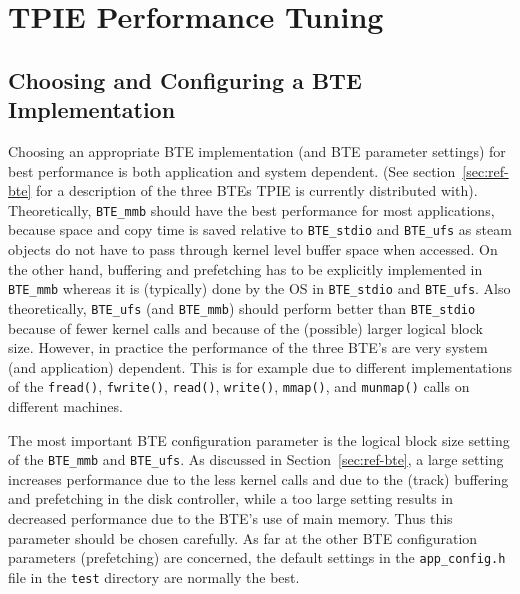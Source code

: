 \section{TPIE Performance Tuning}

\subsection{Choosing and Configuring a BTE Implementation}
\label{sec:choosingbte}


Choosing an appropriate BTE implementation (and BTE parameter settings) for
best performance is both application and system dependent. (See
section~\ref{sec:ref-bte} for a description of the three BTEs TPIE is
currently distributed with). Theoretically, \verb|BTE_mmb| should have the
best performance for most applications, because space and copy time is
saved relative to \verb|BTE_stdio| and \verb|BTE_ufs| as steam objects do
not have to pass through kernel level buffer space when accessed. On the
other hand, buffering and prefetching has to be explicitly implemented in
\verb|BTE_mmb| whereas it is (typically) done by the OS in \verb|BTE_stdio|
and \verb|BTE_ufs|. Also theoretically, \verb|BTE_ufs| (and \verb|BTE_mmb|)
should perform better than \verb|BTE_stdio| because of fewer kernel calls
and because of the (possible) larger logical block size. However, in
practice the performance of the three BTE's are very system (and
application) dependent. This is for example due to different
implementations of the \verb|fread()|, \verb|fwrite()|, \verb|read()|,
\verb|write()|, \verb|mmap()|, and \verb|munmap()| calls on different
machines.

The most important BTE configuration parameter is the logical block size
setting of the \verb|BTE_mmb| and \verb|BTE_ufs|. As discussed in
Section~\ref{sec:ref-bte}, a large setting increases performance due to the
less kernel calls and due to the (track) buffering and prefetching in the
disk controller, while a too large setting results in decreased performance
due to the BTE's use of main memory. Thus this parameter should be chosen
carefully. As far at the other BTE configuration parameters (prefetching)
are concerned, the default settings in the \verb|app_config.h| file in the
\verb|test| directory are normally the best.


